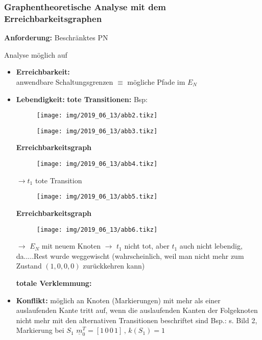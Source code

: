 \subsubsection{Graphentheoretische Analyse mit dem Erreichbarkeitsgraphen}
\textbf{Anforderung:} Beschränktes PN

Analyse möglich auf 
\begin{itemize}
	\item{\textbf{Erreichbarkeit:}} \\
	anwendbare Schaltungsgrenzen $\equiv$ mögliche Pfade im $E_N$
	\item{\textbf{Lebendigkeit:}} \subitem{-} \textbf{tote Transitionen: }  \newline
 	\subsubitem Bsp:	
 	
 	\begin{figure}[H]
 		\centering
 		\texttt{[image: img/2019\_06\_13/abb2.tikz]}
 	\end{figure}
		\begin{figure}[H]
			\centering
			\texttt{[image: img/2019\_06\_13/abb3.tikz]}
		\end{figure}
		
		\textbf{Erreichbarkeitsgraph}
		
		\begin{figure}[H]
			\centering
			\texttt{[image: img/2019\_06\_13/abb4.tikz]}
		\end{figure}
	$\rightarrow t_1$ tote Transition
	
	\begin{figure}[H]
		\centering
		\texttt{[image: img/2019\_06\_13/abb5.tikz]}
	\end{figure}
	
	\textbf{Erreichbarkeitsgraph}
	
	\begin{figure}[H]
		\centering
		\texttt{[image: img/2019\_06\_13/abb6.tikz]}
	\end{figure}
	$\rightarrow$ $E_N$ mit neuem Knoten $\rightarrow$ $t_1$ nicht tot, aber $t_1$ auch nicht lebendig, da.....Rest wurde weggewischt (wahrscheinlich, weil man nicht mehr zum Zustand $(1,0,0,0)$ zurückkehren kann) %
	

	
	
	\subitem{-} \textbf{totale Verklemmung:} \\
	\item{\textbf{Konflikt:}} 
	\subitem{-} möglich an Knoten (Markierungen) mit mehr als einer auslaufenden Kante
	\subitem{-} tritt auf, wenn die auslaufenden Kanten der Folgeknoten nicht mehr mit den alternativen Transitionen beschriftet sind  %
	Bsp.: s. Bild 2, Markierung bei $S_1$
	$\underline{m}_0^{T} = [1\, 0\, 0\,  1] \, , \, k(S_1) = 1$
	

\end{itemize}
